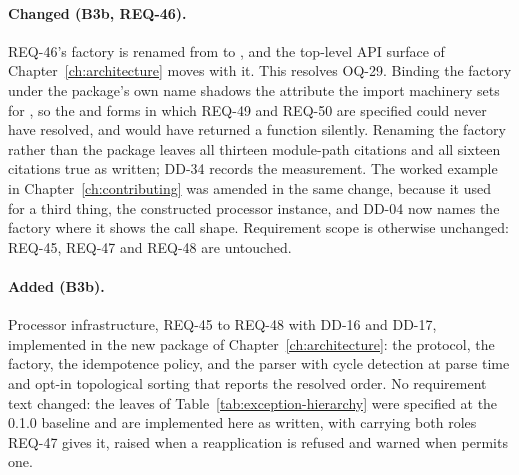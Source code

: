 \paragraph{Changed (B3b, REQ-46).} \stable{} REQ-46's factory is
renamed from  to
, and the top-level
API surface of Chapter~\ref{ch:architecture} moves with it. This
resolves OQ-29. Binding the factory under the package's own name
shadows the attribute the import machinery sets for ,
so the  and  forms in which
REQ-49 and REQ-50 are specified could never have resolved, and
 would have returned a function
silently. Renaming the factory rather than the package leaves all
thirteen module-path citations and all sixteen 
citations true as written; DD-34 records the measurement. The worked
example in Chapter~\ref{ch:contributing} was amended in the same
change, because it used  for a third thing, the constructed
processor instance, and DD-04 now names the factory where it shows the
call shape. Requirement scope is otherwise unchanged: REQ-45, REQ-47
and REQ-48 are untouched.

\paragraph{Added (B3b).} Processor infrastructure, REQ-45 to REQ-48
with DD-16 and DD-17, implemented in the new  package of
Chapter~\ref{ch:architecture}: the  protocol, the
 factory, the idempotence policy, and the
 parser with cycle detection at parse time and opt-in
topological sorting that reports the resolved order. No requirement
text changed: the  leaves of
Table~\ref{tab:exception-hierarchy} were specified at the 0.1.0
baseline and are implemented here as written, with
 carrying both roles REQ-47 gives it,
raised when a reapplication is refused and warned when 
permits one.

